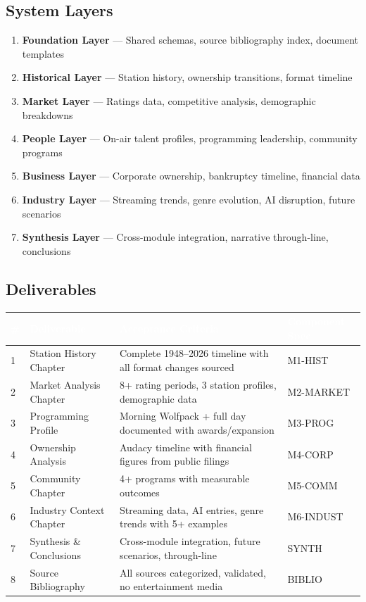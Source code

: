 \documentclass[11pt,letterpaper]{article}
\newcommand{\tableheader}[1]{\textbf{\sffamily\textcolor{white}{#1}}}
\begin{document}
\subsection{System Layers}

\begin{enumerate}[leftmargin=2em]
\item \textbf{Foundation Layer} --- Shared schemas, source bibliography index, document templates
\item \textbf{Historical Layer} --- Station history, ownership transitions, format timeline
\item \textbf{Market Layer} --- Ratings data, competitive analysis, demographic breakdowns
\item \textbf{People Layer} --- On-air talent profiles, programming leadership, community programs
\item \textbf{Business Layer} --- Corporate ownership, bankruptcy timeline, financial data
\item \textbf{Industry Layer} --- Streaming trends, genre evolution, AI disruption, future scenarios
\item \textbf{Synthesis Layer} --- Cross-module integration, narrative through-line, conclusions
\end{enumerate}

\subsection{Deliverables}

\begin{center}
\begin{tabularx}{\textwidth}{C{0.5cm}L{3.5cm}XL{2.5cm}}
\toprule
{}
\tableheader{\#} & \tableheader{Deliverable} & \tableheader{Acceptance Criteria} & \tableheader{Component Spec} \\
 & Station History Chapter & Complete 1948--2026 timeline with all format changes sourced & M1-HIST \\
2 & Market Analysis Chapter & 8+ rating periods, 3 station profiles, demographic data & M2-MARKET \\
3 & Programming Profile & Morning Wolfpack + full day documented with awards/expansion & M3-PROG \\
4 & Ownership Analysis & Audacy timeline with financial figures from public filings & M4-CORP \\
5 & Community Chapter & 4+ programs with measurable outcomes & M5-COMM \\
6 & Industry Context Chapter & Streaming data, AI entries, genre trends with 5+ examples & M6-INDUST \\
7 & Synthesis \& Conclusions & Cross-module integration, future scenarios, through-line & SYNTH \\
8 & Source Bibliography & All sources categorized, validated, no entertainment media & BIBLIO \\
\bottomrule
\end{tabularx}
\end{center}
\end{document}
